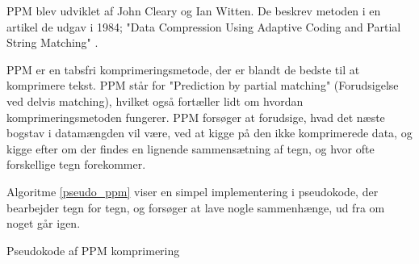 PPM blev udviklet af John Cleary og Ian Witten. De beskrev metoden i en artikel de udgav i 1984; "Data Compression Using Adaptive Coding and Partial String Matching" \cite{Cleary84datacompression}.

PPM er en tabsfri komprimeringsmetode, der er blandt de bedste til at komprimere tekst. PPM står for "Prediction by partial matching" (Forudsigelse ved delvis matching), hvilket også fortæller lidt om hvordan komprimeringsmetoden fungerer. PPM forsøger at forudsige, hvad det næste bogstav i datamængden vil være, ved at kigge på den ikke komprimerede data, og kigge efter om der findes en lignende sammensætning af tegn, og hvor ofte forskellige tegn forekommer. 

Algoritme \ref{pseudo_ppm} viser en simpel implementering i pseudokode, der bearbejder tegn for tegn, og forsøger at lave nogle sammenhænge, ud fra om noget går igen. \cite{ppm_stringology}

\begin{algorithm}[H]
 \SetAlgoLined
\caption{Pseudokode af PPM komprimering \cite{ppm_stringology}}
\label{pseudo_ppm}
\end{algorithm}